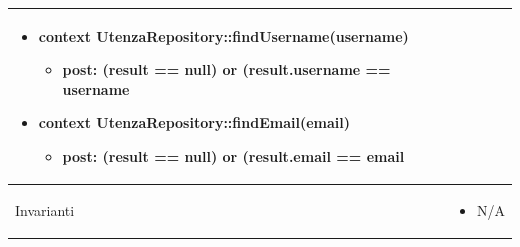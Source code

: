 \begin{tabular}{|| l | p{34em} ||}
\begin{itemize}[leftmargin=*]
	\item \textbf{context} UtenzaRepository::findUsername(username)
	\begin{itemize}
		\item[ ] \textbf{post:} (result == null) or (result.username == username
	\end{itemize}

	\item \textbf{context} UtenzaRepository::findEmail(email)
	\begin{itemize}
		\item[ ] \textbf{post:} (result == null) or (result.email == email
	\end{itemize}
\end{itemize}\\
\hline
Invarianti & \begin{itemize}
	\item N/A
\end{itemize}\\
\hline
\end{tabular}

\newpage
